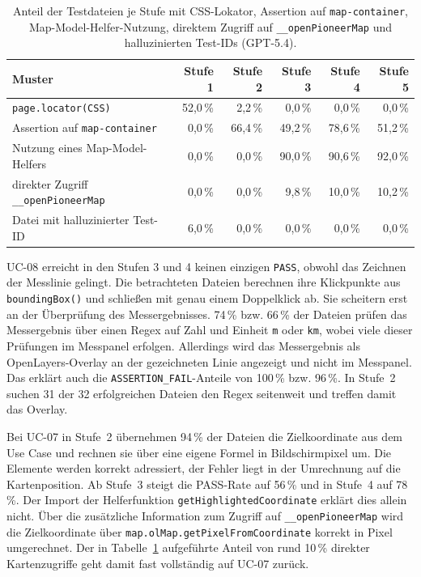 \begin{table}[H]
    \centering
    \caption[Kartenbezogene Codemuster je Stufe (GPT-5.4)]{Anteil der Testdateien je Stufe mit CSS-Lokator, Assertion auf \texttt{map-container}, Map-Model-Helfer-Nutzung, direktem Zugriff auf \texttt{\_\_openPioneerMap} und halluzinierten Test-IDs (GPT-5.4).}
    \label{tab:anhang_gpt54_codemuster}
    \begin{tabular}{lrrrrr}
        \toprule
        Muster & Stufe 1 & Stufe 2 & Stufe 3 & Stufe 4 & Stufe 5 \\
        \midrule
        \texttt{page.locator(CSS)}              & 52{,}0\,\% & 2{,}2\,\%  & 0{,}0\,\%  & 0{,}0\,\%  & 0{,}0\,\%  \\
        Assertion auf \texttt{map-container}    & 0{,}0\,\%  & 66{,}4\,\% & 49{,}2\,\% & 78{,}6\,\% & 51{,}2\,\% \\
        Nutzung eines Map-Model-Helfers         & 0{,}0\,\%  & 0{,}0\,\%  & 90{,}0\,\% & 90{,}6\,\% & 92{,}0\,\% \\
        direkter Zugriff \texttt{\_\_openPioneerMap} & 0{,}0\,\% & 0{,}0\,\% & 9{,}8\,\% & 10{,}0\,\% & 10{,}2\,\% \\
        Datei mit halluzinierter Test-ID        & 6{,}0\,\%  & 0{,}0\,\%  & 0{,}0\,\%  & 0{,}0\,\%  & 0{,}0\,\%  \\
        \bottomrule
    \end{tabular}
\end{table}

UC-08 erreicht in den Stufen 3 und 4 keinen einzigen \texttt{PASS}, obwohl das Zeichnen der Messlinie gelingt. Die betrachteten Dateien berechnen ihre Klickpunkte aus \texttt{boundingBox()} und schließen mit genau einem Doppelklick ab. Sie scheitern erst an der Überprüfung des Messergebnisses. 74\,\% bzw. 66\,\% der Dateien prüfen das Messergebnis über einen Regex auf Zahl und Einheit \texttt{m} oder \texttt{km}, wobei viele dieser Prüfungen im Messpanel erfolgen. Allerdings wird das Messergebnis als OpenLayers-Overlay an der gezeichneten Linie angezeigt und nicht im Messpanel. Das erklärt auch die \texttt{ASSERTION\_FAIL}-Anteile von 100\,\% bzw. 96\,\%. In Stufe~2 suchen 31 der 32 erfolgreichen Dateien den Regex seitenweit und treffen damit das Overlay.

Bei UC-07 in Stufe~2 übernehmen 94\,\% der Dateien die Zielkoordinate aus dem Use Case und rechnen sie über eine eigene Formel in Bildschirmpixel um. Die Elemente werden korrekt adressiert, der Fehler liegt in der Umrechnung auf die Kartenposition. Ab Stufe~3 steigt die PASS-Rate auf 56\,\% und in Stufe~4 auf 78\,\%. Der Import der Helferfunktion \texttt{getHighlightedCoordinate} erklärt dies allein nicht. Über die zusätzliche Information zum Zugriff auf \texttt{\_\_openPioneerMap} wird die Zielkoordinate über \texttt{map.olMap.getPixelFromCoordinate} korrekt in Pixel umgerechnet. Der in Tabelle~\ref{tab:anhang_gpt54_codemuster} aufgeführte Anteil von rund 10\,\% direkter Kartenzugriffe geht damit fast vollständig auf UC-07 zurück.

